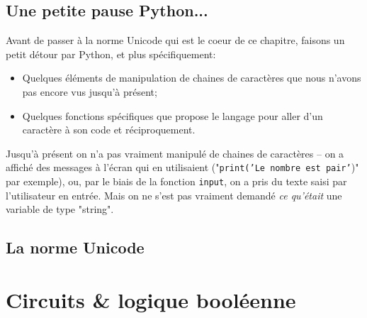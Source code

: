 \documentclass[12pt]{article}
\begin{document}
	\subsection{Une petite pause Python...}
	Avant de passer à la norme Unicode qui est le coeur de ce chapitre, faisons un petit détour par Python, et plus spécifiquement:
	\begin{itemize}
		\item Quelques éléments de manipulation de chaines de caractères que nous n'avons pas encore vus jusqu'à présent;
		\item Quelques fonctions spécifiques que propose le langage pour aller d'un caractère à son code et réciproquement.
	\end{itemize}
	
	Jusqu'à présent on n'a pas vraiment manipulé de chaines de caractères -- on a affiché des messages à l'écran qui en utilisaient ("\texttt{print('Le nombre est pair'})" par exemple), ou, par le biais de la fonction \texttt{input}, on a pris du texte saisi par l'utilisateur en entrée. Mais on ne s'est pas vraiment demandé \textit{ce qu'était} une variable de type "string".
	
	
	
	\subsection{La norme Unicode}
	\pagebreak
	\section{Circuits \& logique booléenne}
	
\end{document}
